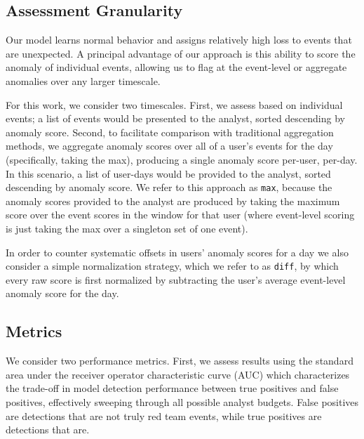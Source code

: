 \documentclass[letterpaper]{article} %
\begin{document}
\subsection{Assessment Granularity} \label{subsec:detectinganomaly}
Our model learns normal behavior and assigns relatively high loss to events that are unexpected.
A principal advantage of our approach is this ability to score the anomaly of individual events, allowing us to flag at the event-level or aggregate anomalies over any larger timescale. 

For this work, we consider two timescales.  First, we assess based on individual events; a list of events would be presented to the analyst, sorted  descending by anomaly score. Second, to facilitate comparison with traditional aggregation methods, we aggregate anomaly scores over all of a user's events for the day (specifically, taking the max), producing a single anomaly score per-user, per-day.  In this scenario, a list of user-days would be provided to the analyst, sorted descending by anomaly score.  We refer to this approach as \verb|max|, because the anomaly scores provided to the analyst are produced by taking the maximum score over the event scores in the window for that user (where event-level scoring is just taking the max over a singleton set of one event).

 In order to counter systematic offsets in users' anomaly scores for a day we also consider a simple normalization strategy, which we refer to as \verb|diff|, by which every raw score is first normalized by subtracting the user's average event-level anomaly score for the day. 
 
\subsection{Metrics} 
We consider two performance metrics.
First, we assess results using the standard area under the receiver operator characteristic  curve (AUC) which characterizes the trade-off in model detection performance between true positives and false positives, effectively sweeping through all possible analyst budgets.
False positives are detections that are not truly red team events, while true positives are detections that are. 
 
\end{document}
